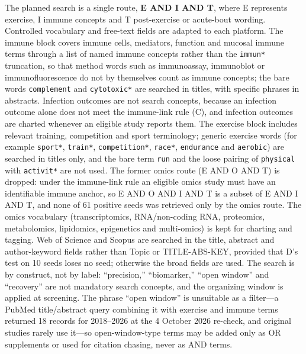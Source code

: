 \documentclass[
  11pt,
  a4paper,
]{article}
\newcounter{none} %
\begin{document}
The planned search is a single route, \textbf{E AND I AND T}, where E
represents exercise, I immune concepts and T post-exercise or acute-bout
wording. Controlled vocabulary and free-text fields are adapted to each
platform. The immune block covers immune cells, mediators, function and
mucosal immune terms through a list of named immune concepts rather than
the \texttt{immun*} truncation, so that method words such as
immunoassay, immunoblot or immunofluorescence do not by themselves count
as immune concepts; the bare words \texttt{complement} and
\texttt{cytotoxic*} are searched in titles, with specific phrases in
abstracts. Infection outcomes are not search concepts, because an
infection outcome alone does not meet the immune-link rule (C), and
infection outcomes are charted whenever an eligible study reports them.
The exercise block includes relevant training, competition and sport
terminology; generic exercise words (for example \texttt{sport*},
\texttt{train*}, \texttt{competition*}, \texttt{race*},
\texttt{endurance} and \texttt{aerobic}) are searched in titles only,
and the bare term \texttt{run} and the loose pairing of
\texttt{physical} with \texttt{activit*} are not used. The former omics
route (E AND O AND T) is dropped: under the immune-link rule an eligible
omics study must have an identifiable immune anchor, so E AND O AND I
AND T is a subset of E AND I AND T, and none of 61 positive seeds was
retrieved only by the omics route. The omics vocabulary
(transcriptomics, RNA/non-coding RNA, proteomics, metabolomics,
lipidomics, epigenetics and multi-omics) is kept for charting and
tagging. Web of Science and Scopus are searched in the title, abstract
and author-keyword fields rather than Topic or TITLE-ABS-KEY, provided
that D's test on 10 seeds loses no seed; otherwise the broad fields are
used. The search is by construct, not by label: ``precision,''
``biomarker,'' ``open window'' and ``recovery'' are not mandatory search
concepts, and the organizing window is applied at screening. The phrase
``open window'' is unsuitable as a filter---a PubMed title/abstract
query combining it with exercise and immune terms returned 18 records
for 2018--2026 at the 4 October 2026 re-check, and original studies
rarely use it---so open-window-type terms may be added only as OR
supplements or used for citation chasing, never as AND terms.
\end{document}
